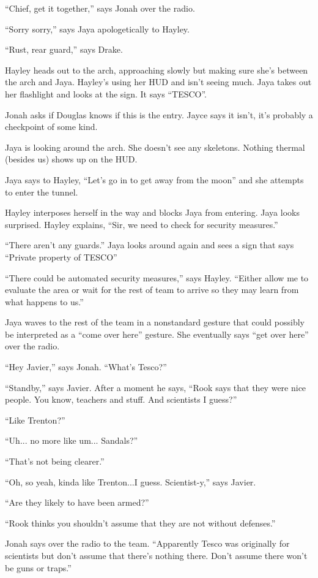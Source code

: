 ``Chief, get it together,'' says Jonah over the radio.

``Sorry sorry,'' says Jaya apologetically to Hayley.

``Rust, rear guard,'' says Drake.

Hayley heads out to the arch, approaching slowly but making sure she's between the arch and Jaya.  Hayley's using her HUD and isn't seeing much.  Jaya takes out her flashlight and looks at the sign.  It says ``TESCO''.  

Jonah asks if Douglas knows if this is the entry.   Jayce says it isn't, it's probably a checkpoint of some kind.  

Jaya is looking around the arch.  She doesn't see any skeletons.  Nothing thermal (besides us) shows up on the HUD.

Jaya says to Hayley, ``Let's go in to get away from the moon'' and she attempts to enter the tunnel.

Hayley interposes herself in the way and blocks Jaya from entering.  Jaya looks surprised.  Hayley explains, ``Sir, we need to check for security measures.''

``There aren't any guards.''  Jaya looks around again and sees a sign that says ``Private property of TESCO''

``There could be automated security measures,'' says Hayley.  ``Either allow me to evaluate the area or wait for the rest of team to arrive so they may learn from what happens to us.''

Jaya waves to the rest of the team in a nonstandard gesture that could possibly be interpreted as a ``come over here'' gesture.  She eventually says ``get over here'' over the radio.

``Hey Javier,'' says Jonah.  ``What's Tesco?''

``Standby,'' says Javier.  After a moment he says, ``Rook says that they were nice people.  You know, teachers and stuff.  And scientists I guess?''

``Like Trenton?''

``Uh... no more like um... Sandals?''

``That's not being clearer.''

``Oh, so yeah, kinda like Trenton...I guess.  Scientist-y,'' says Javier.

``Are they likely to have been armed?''

``Rook thinks you shouldn't assume that they are not without defenses.''

Jonah says over the radio to the team.  ``Apparently Tesco was originally for scientists but don't assume that there's nothing there.  Don't assume there won't be guns or traps.''

